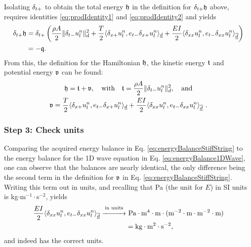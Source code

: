 {Isolating $\delta_{t+}$ to obtain the total energy $\mathfrak{h}$ in the definition for $\delta_{t+} \mathfrak{h}$ above, requires identities \eqref{eq:prodIdentity1} and \eqref{eq:prodIdentity2} and yields
\begin{equation*}
    \begin{aligned}
        \delta_{t+}\mathfrak{h} &= \delta_{t+}\left(\frac{\rho A}{2}\lVert\delta_{t-} u_l^n\rVert_d^2 + \frac{T}{2}\langle\delta_{x+}u_l^n, e_{t-}\delta_{x+}u_l^n\rangle_{\underline{d}} + \frac{EI}{2}\langle\delta_{xx}u_l^n, e_{t-}\delta_{xx}u_l^n\rangle_{\overline{\underline{d}}}\right) \\
        &=-\mathfrak{q}.
    \end{aligned}
\end{equation*}
From this, the definition for the Hamiltonian $\mathfrak{h}$, the kinetic energy $\mathfrak{t}$ and potential energy $\mathfrak{v}$ can be found:
\begin{equation}\label{eq:energyBalanceStiffString}
    \begin{gathered}
        \mathfrak{h} = \mathfrak{t} + \mathfrak{v}, \quad \text{with} \quad \mathfrak{t} = \frac{\rho A}{2}\lVert\delta_{t-} u_l^n\rVert^2_d,\quad \text{and} \\
        \mathfrak{v} = \frac{T}{2}\langle\delta_{x+}u_l^n, e_{t-}\delta_{x+}u_l^n\rangle_{\underline{d}} + \frac{EI}{2}\langle\delta_{xx}u_l^n, e_{t-}\delta_{xx}u_l^n\rangle_{\overline{\underline{d}}}\ .
    \end{gathered}
\end{equation}

\subsubsection{Step 3: Check units}
Comparing the acquired energy balance in Eq. \eqref{eq:energyBalanceStiffString} to the energy balance for the 1D wave equation in Eq. \eqref{eq:energyBalance1DWave}, one can observe that the balances are nearly identical, the only difference being the second term in the definition for $\mathfrak{v}$ in Eq. \eqref{eq:energyBalanceStiffString}. 
Writing this term out in units, and recalling that Pa (the unit for $E$) in SI units is kg$\cdot$m$^{-1}\cdot$s$^{-2}$, yields
\begin{align*}
    \frac{EI}{2}\langle\delta_{xx}u_l^n, e_{t-}\delta_{xx}u_l^n\rangle_{\overline{\underline{d}}}\overset{\text{in units}}{\xrightarrow{\hspace*{1cm}}}& \ \text{Pa}\cdot \text{m}^4 \cdot \text{m} \cdot (\text{m}^{-2} \cdot \text{m} \cdot \text{m}^{-2} \cdot \text{m}) \\
    & = \text{kg} \cdot \text{m}^2 \cdot \text{s}^{-2},
\end{align*}
and indeed has the correct units. 

}

